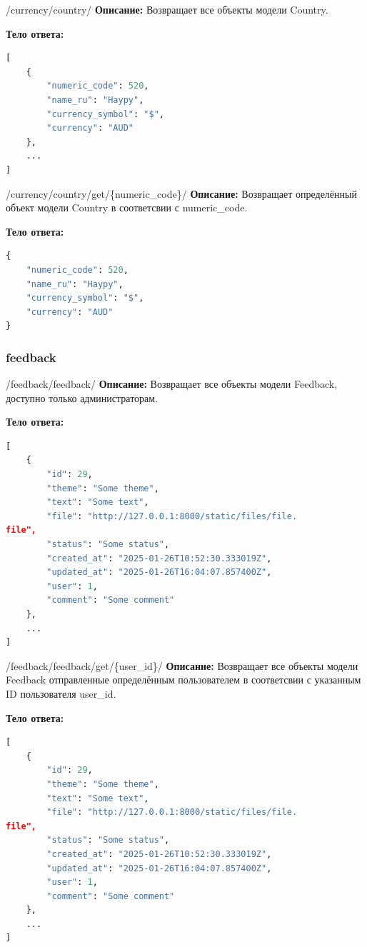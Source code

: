 \documentclass[a4paper,14pt]{extarticle}
\begin{document}
	\begin{getapi}{/currency/country/}
		\textbf{Описание:} Возвращает все объекты модели Country.\medskip
		
		\textbf{Тело ответа:}
		\begin{lstlisting}[language=Python]
[
    {
	    "numeric_code": 520,
	    "name_ru": "Haypy",
	    "currency_symbol": "$",
	    "currency": "AUD"
    },
    ...
]
		\end{lstlisting}
	\end{getapi}
	
	\begin{getapi}{/currency/country/get/\{numeric\_code\}/}
		\textbf{Описание:} Возвращает определённый объект модели Country в соответсвии с numeric\_code.\medskip
		
		\textbf{Тело ответа:}
		\begin{lstlisting}[language=Python]
{
	"numeric_code": 520,
	"name_ru": "Haypy",
	"currency_symbol": "$",
	"currency": "AUD"
}
		\end{lstlisting}
	\end{getapi}

	\subsubsection{feedback}	
	\begin{getapi}{/feedback/feedback/}
		\textbf{Описание:} Возвращает все объекты модели Feedback, доступно только администраторам.\medskip
		
		\textbf{Тело ответа:}
		\begin{lstlisting}[language=Python]
[
    {
        "id": 29,
        "theme": "Some theme",
        "text": "Some text",
        "file": "http://127.0.0.1:8000/static/files/file.
file",
        "status": "Some status",
        "created_at": "2025-01-26T10:52:30.333019Z",
        "updated_at": "2025-01-26T16:04:07.857400Z",
        "user": 1,
        "comment": "Some comment"
    },
    ...
]
		\end{lstlisting}
	\end{getapi}
	
	\begin{getapi}{/feedback/feedback/get/\{user\_id\}/}
		\textbf{Описание:} Возвращает все объекты модели Feedback отправленные определённым пользователем в соответсвии с указанным ID пользователя user\_id.\medskip
		
		\textbf{Тело ответа:}
		\begin{lstlisting}[language=Python]
[
    {
        "id": 29,
        "theme": "Some theme",
        "text": "Some text",
        "file": "http://127.0.0.1:8000/static/files/file.
file",
        "status": "Some status",
        "created_at": "2025-01-26T10:52:30.333019Z",
        "updated_at": "2025-01-26T16:04:07.857400Z",
        "user": 1,
        "comment": "Some comment"
    },
    ...
]
		\end{lstlisting}
	\end{getapi}
	
\end{document}
